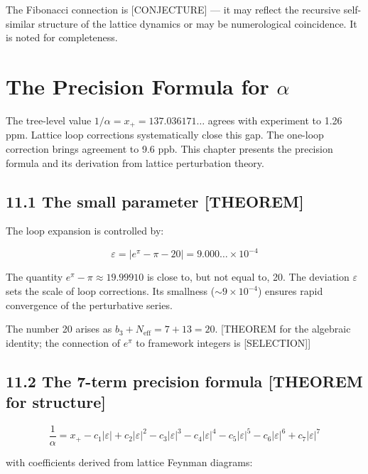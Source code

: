 \documentclass[
  11pt,
  letterpaper,
  twoside,
  openright]{book}
\begin{document}
The Fibonacci connection is {[}CONJECTURE{]} --- it may reflect the
recursive self-similar structure of the lattice dynamics or may be
numerological coincidence. It is noted for completeness.

\chapter{\texorpdfstring{The Precision Formula for
\(\alpha\)}{The Precision Formula for \textbackslash alpha}}\label{sec-precision}

The tree-level value \(1/\alpha = x_+ = 137.036171\ldots\) agrees with
experiment to 1.26 ppm. Lattice loop corrections systematically close
this gap. The one-loop correction brings agreement to 9.6 ppb. This
chapter presents the precision formula and its derivation from lattice
perturbation theory.

\section{11.1 The small parameter
{[}THEOREM{]}}\label{the-small-parameter-theorem}

The loop expansion is controlled by:

\[
\varepsilon = |e^\pi - \pi - 20| = 9.000\ldots \times 10^{-4}
\tag{11.1}
\]

The quantity \(e^\pi - \pi \approx 19.99910\) is close to, but not equal
to, 20. The deviation \(\varepsilon\) sets the scale of loop
corrections. Its smallness (\(\sim 9 \times 10^{-4}\)) ensures rapid
convergence of the perturbative series.

The number 20 arises as \(b_3 + N_{\text{eff}} = 7 + 13 = 20\).
{[}THEOREM for the algebraic identity; the connection of \(e^\pi\) to
framework integers is {[}SELECTION{]}{]}

\section{11.2 The 7-term precision formula {[}THEOREM for
structure{]}}\label{the-7-term-precision-formula-theorem-for-structure}

\[
\frac{1}{\alpha} = x_+ - c_1 |\varepsilon| + c_2 |\varepsilon|^2 - c_3 |\varepsilon|^3 - c_4 |\varepsilon|^4 - c_5 |\varepsilon|^5 - c_6 |\varepsilon|^6 + c_7 |\varepsilon|^7
\tag{11.2}
\]

with coefficients derived from lattice Feynman diagrams:
\end{document}

